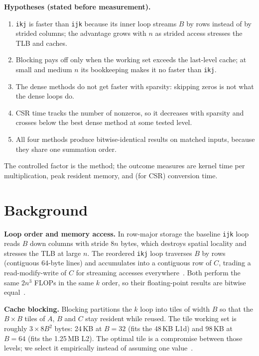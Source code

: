 \documentclass[11pt,a4paper]{article}
\begin{document}
\textbf{Hypotheses (stated before measurement).}
\begin{enumerate}
  \item[H1:] \texttt{ikj} is faster than \texttt{ijk} because its inner loop
        streams $B$ by rows instead of by strided columns; the advantage grows
        with $n$ as strided access stresses the TLB and caches.
  \item[H2:] Blocking pays off only when the working set exceeds the last-level
        cache; at small and medium $n$ its bookkeeping makes it no faster than
        \texttt{ikj}.
  \item[H3:] The dense methods do not get faster with sparsity: skipping zeros is
        not what the dense loops do.
  \item[H4:] CSR time tracks the number of nonzeros, so it decreases with
        sparsity and crosses below the best dense method at some tested level.
  \item[H5:] All four methods produce bitwise-identical results on matched
        inputs, because they share one summation order.
\end{enumerate}

The controlled factor is the method; the outcome measures are kernel time per
multiplication, peak resident memory, and (for CSR) conversion time.

\section{Background}

\textbf{Loop order and memory access.} In row-major storage the baseline
\texttt{ijk} loop reads $B$ down columns with stride $8n$ bytes, which destroys
spatial locality and stresses the TLB at large $n$. The reordered \texttt{ikj}
loop traverses $B$ by rows (contiguous 64-byte lines) and accumulates into a
contiguous row of $C$, trading a read-modify-write of $C$ for streaming accesses
everywhere~\cite{golub2013,cormen2022}. Both perform the same $2n^3$ FLOPs in the
same $k$ order, so their floating-point results are bitwise equal~\cite{isoC11}.

\textbf{Cache blocking.} Blocking partitions the $k$ loop into tiles of width $B$
so that the $B \times B$ tiles of $A$, $B$ and $C$ stay resident while reused.
The tile working set is roughly $3 \times 8B^2$ bytes: 24\,KB at $B=32$ (fits the
48\,KB L1d) and 98\,KB at $B=64$ (fits the 1.25\,MB L2). The optimal tile is a
compromise between those levels; we select it empirically instead of assuming one
value~\cite{golub2013}.
\end{document}
